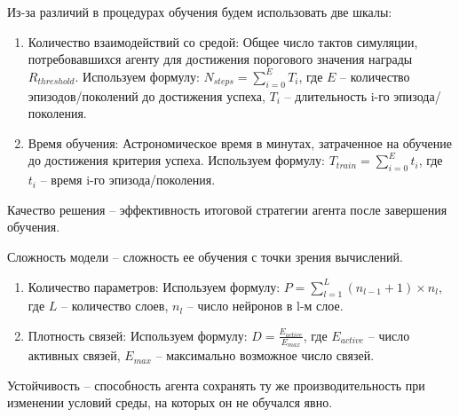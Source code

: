 Из-за различий в процедурах обучения будем использовать две шкалы:

\begin{enumerate}

  \item Количество взаимодействий со средой: Общее число тактов симуляции, потребовавшихся агенту для достижения порогового значения награды $R_{threshold}$. Используем формулу: $N_{steps} = \sum^E_{i=0}T_i$, где $E$ -- количество эпизодов/поколений до достижения успеха, $T_i$ -- длительность i-го эпизода/поколения.

  \item Время обучения: Астрономическое время в минутах, затраченное на обучение до достижения критерия успеха. Используем формулу: $T_{train} = \sum^E_{i=0}t_i$, где $t_i$ -- время i-го эпизода/поколения.
\end{enumerate}

\begin{definition}
  \label{def:quality}
  Качество решения -- эффективность итоговой стратегии агента после завершения обучения.
\end{definition}

\begin{definition}
  \label{def:complexity}
  Сложность модели -- сложность ее обучения с точки зрения вычислений.
\end{definition}

\begin{enumerate}

  \item Количество параметров: Используем формулу: $P = \sum_{l=1}^{L} (n_{l-1} + 1) \times n_l$, где $L$ -- количество слоев, $n_l$ -- число нейронов в l-м слое.

  \item Плотность связей: Используем формулу: $D = \frac{E_{active}}{E_{max}}$, где $E_{active}$ -- число активных связей, $E_{max}$ -- максимально возможное число связей.

\end{enumerate}

\begin{definition}
  \label{def:robustness}
  Устойчивость -- способность агента сохранять ту же производительность при изменении условий среды, на которых он не обучался явно.
\end{definition}

